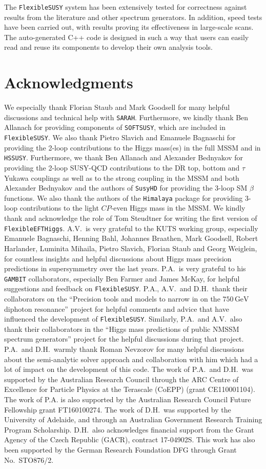 \documentclass[final,3p,11pt,pdflatex]{elsarticle}
\makeatletter
\newcommand{\modelname}[1]{\texttt{#1}\@\xspace}
\newcommand{\sarah}{\texttt{SARAH}\@\xspace}
\newcommand{\fs}{\texttt{FlexibleSUSY}\@\xspace}
\newcommand{\HSSUSY}{\modelname{HSSUSY}}
\newcommand{\susyhd}{\texttt{SusyHD}\@\xspace}
\newcommand{\softsusy}{\texttt{SOFTSUSY}\@\xspace}
\newcommand{\Himalaya}{\texttt{Himalaya}\@\xspace}
\newcommand{\GAMBIT}{\texttt{GAMBIT}\@\xspace}
\newcommand{\feft}{\texttt{Flex\-ib\-le\-EFT\-Higgs}\@\xspace}
\newcommand{\ol}[1]{\overline{#1}}
\newcommand{\DRbar}{\ensuremath{\ol{\text{DR}}}\xspace}
\newcommand{\unit}[1]{\,\text{#1}}      %
\newcommand{\CP}{\ensuremath{CP}\xspace}
\newcommand{\SQCD}{SUSY-QCD\xspace}
\makeatother
\begin{document}
The \fs system has been extensively tested for correctness against
results from the literature and other spectrum generators.  In
addition, speed tests have been carried out, with results proving its
effectiveness in large-scale scans.  The auto-generated C++ code is
designed in such a way that users can easily read and reuse
its components to develop their own analysis tools.

\section*{Acknowledgments}

We especially thank Florian Staub and Mark Goodsell for many helpful
discussions and technical help with \sarah.  Furthermore, we kindly
thank Ben Allanach for providing components of \softsusy, which are
included in \fs.  We also thank Pietro Slavich and Emanuele Bagnaschi
for providing the 2-loop contributions to the Higgs mass(es) in the
full MSSM and in \HSSUSY.
%
Furthermore, we thank Ben
Allanach and Alexander Bednyakov for providing the 2-loop \SQCD
contributions to the \DRbar top, bottom and $\tau$ Yukawa couplings as
well as to the strong coupling in the MSSM and both Alexander
Bednyakov and the authors of \susyhd for providing the 3-loop SM $\beta$
functions.  We also thank the authors of the \Himalaya
package for providing 3-loop contributions to the light \CP-even Higgs mass
in the MSSM\@.
%
We kindly thank and acknowledge the role of Tom Steudtner for writing
the first version of \feft.
%
A.V.\ is very grateful to the KUTS working group, especially Emanuele
Bagnaschi, Henning Bahl, Johannes Braathen, Mark Goodsell, Robert
Harlander, Luminita Mihaila, Pietro Slavich, Florian Staub and Georg
Weiglein, for countless insights and helpful discussions about Higgs
mass precision predictions in supersymmetry over the last years.
%
P.A.\ is very grateful to his \GAMBIT collaborators, especially Ben
Farmer and James McKay, for helpful suggestions and feedback on
\fs. P.A., A.V.\ and D.H.\ thank their collaborators on the
``Precision tools and models to narrow in on the $750\unit{GeV}$
diphoton resonance'' project for helpful comments and advice that have
influenced the development of \fs.  Similarly, P.A.\ and A.V.\ also
thank their collaborators in the ``Higgs mass predictions of public
NMSSM spectrum generators'' project for the helpful discussions during
that project.  P.A.\ and D.H.\ warmly thank Roman Nevzorov for many
helpful discussions about the semi-analytic solver approach and
collaboration with him which had a lot of impact on the development of
this code.  The work of P.A.\ and D.H.\ was supported by the Australian
Research Council through the ARC Centre of Excellence for Particle Physics
at the Terascale (CoEPP) (grant CE110001104).  The work of P.A. is also
supported by the Australian Research Council Future Fellowship grant
FT160100274.  The work of D.H.\ was supported by the University of Adelaide,
and through an Australian Government Research Training Program Scholarship.
D.H.\ also acknowledges financial support from the Grant Agency of the Czech
Republic (GACR), contract 17-04902S.  This work has also been supported by the
German Research Foundation DFG through Grant No.~STO876/2.
\end{document}
